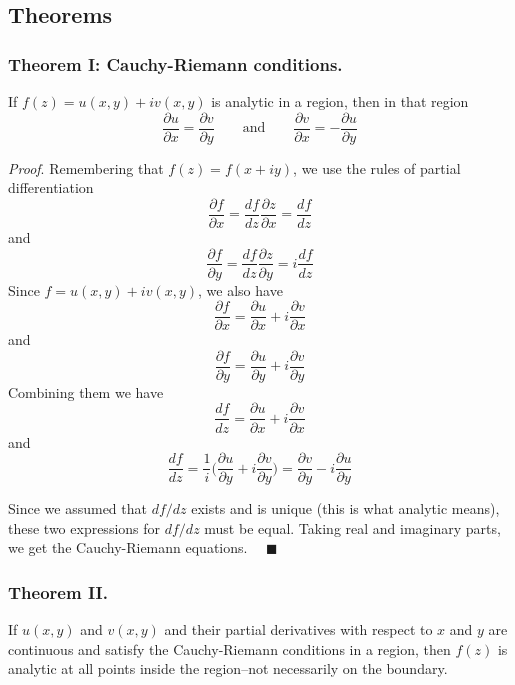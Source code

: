 \documentclass[../../../main.tex]{subfiles}
\begin{document}
\subsection{Theorems}
\subsubsection{Theorem I: Cauchy-Riemann conditions.} If $f(z) = u(x, y) + iv(x, y)$ is analytic in a 
region, then in that region
\begin{equation*}
    \frac{\partial u}{\partial x}=\frac{\partial v}{\partial y}
    \qquad\text{and}\qquad 
    \frac{\partial v}{\partial x}=-\frac{\partial u}{\partial y}
\end{equation*}

\emph{Proof}. Remembering that $f (z)= f (x + iy)$, we use the rules of partial differentiation 
\begin{equation*}
    \frac{\partial f}{\partial x}=\frac{df}{dz}\frac{\partial z}{\partial x}=\frac{df}{dz}
\end{equation*}
and
\begin{equation*}
    \frac{\partial f}{\partial y}=\frac{df}{dz}\frac{\partial z}{\partial y}=i\frac{df}{dz}
\end{equation*}
Since $f = u(x, y) + iv(x, y)$, we also have
\begin{equation*}
    \frac{\partial f}{\partial x}=\frac{\partial u}{\partial x}+i \frac{\partial v}{\partial x}
\end{equation*}
and
\begin{equation*}
    \frac{\partial f}{\partial y}=\frac{\partial u}{\partial y}+i \frac{\partial v}{\partial y}
\end{equation*}
Combining them we have
\begin{equation*}
    \frac{df}{dz}=\frac{\partial u}{\partial x}+i \frac{\partial v}{\partial x}
\end{equation*}
and
\begin{equation*}
    \frac{df}{dz}=\frac{1}{i}\biggl(\frac{\partial u}{\partial y}+i \frac{\partial v}{\partial y}\biggr) =\frac{\partial v}{\partial y}-i \frac{\partial u}{\partial y}
\end{equation*}

Since we assumed that $df /dz$ exists and is unique (this is what analytic means), these two expressions for $df /dz$ must be equal. Taking real and imaginary parts, we get the Cauchy-Riemann equations. $\quad \blacksquare$

\subsubsection{Theorem II.} If $u(x, y)$ and $v(x, y)$ and their partial derivatives with respect to $x$ and $y$ are continuous and satisfy the Cauchy-Riemann conditions in a region, then $f(z)$ is analytic at all points inside the region--not necessarily on the boundary.
\end{document}
